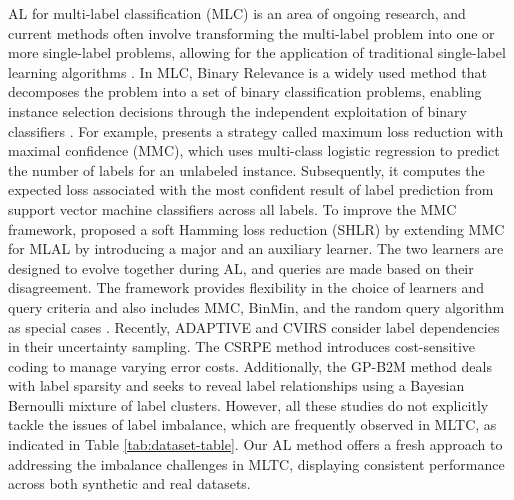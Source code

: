 \documentclass[letterpaper]{article} %
\begin{document}
AL for multi-label classification (MLC) is an area of ongoing research, and current methods often involve transforming the multi-label problem into one or more single-label problems, allowing for the application of traditional single-label learning algorithms \cite{Cherman2019, REYES2018494}. In MLC, Binary Relevance is a widely used method that decomposes the problem into a set of binary classification problems, enabling instance selection decisions through the independent exploitation of binary classifiers \cite{pmlr-v97-shi19b}.
For example, \citet{mmc2009} presents a strategy called maximum loss reduction with maximal confidence (MMC), which uses multi-class logistic regression to predict the number of labels for an unlabeled instance. Subsequently, it computes the expected
loss associated with the most
confident result of label prediction from support vector machine classifiers across all labels.
To improve the MMC framework, \citet{pmlr-v20-hung11} proposed a soft Hamming loss reduction (SHLR) by extending MMC for MLAL by introducing a major and an auxiliary learner. The two learners are designed to evolve together during AL, and queries are made based on their disagreement. The framework provides flexibility in the choice of learners and query criteria and also includes MMC, BinMin, and the random query algorithm as special cases \cite{10.1007/978-3-319-97304-3_73, REYES2018494}.
Recently, ADAPTIVE \cite{adaptive2013} and CVIRS \cite{REYES2018494}  consider
label dependencies in their uncertainty sampling.
The CSRPE \cite{10.1007/978-3-319-93034-3_12} method introduces cost-sensitive coding to manage varying error costs. Additionally, the GP-B2M \cite{gaupb2_2021} method deals with label sparsity and seeks to reveal label relationships using a Bayesian Bernoulli mixture of label clusters.
However, all these studies do not explicitly tackle the issues of label imbalance, which are frequently observed in MLTC, as indicated in Table \ref{tab:dataset-table}.
Our AL method offers a fresh approach to addressing the imbalance challenges in MLTC, displaying consistent performance across both synthetic and real datasets.
\end{document}
